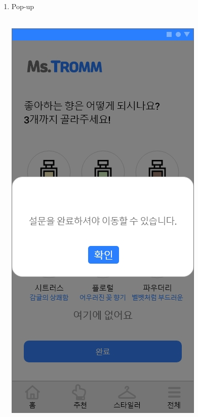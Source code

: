 \documentclass[conference]{IEEEtran}
\begin{document}
\begin{enumerate}
\begin{enumerate}
\begin{itemize}
        \end{itemize} 
\break
    \item Pop-up\\ \\
    \begin{itemize}
    \centerline{\includegraphics[scale=0.32]{assets/설문지6.jpg}}

\end{itemize}
\end{enumerate}
\end{enumerate}
\end{document}
